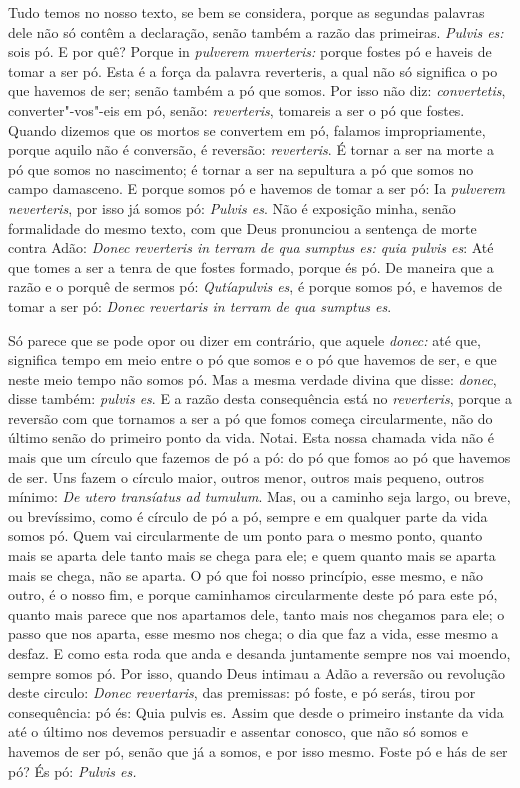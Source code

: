 Tudo temos no nosso texto, se bem se considera, porque as segundas
palavras dele não só contêm a declaração, senão também a razão das
primeiras. \emph{Pulvis es:} sois pó. E por quê? Porque in
\emph{pulverem mverteris:} porque fostes pó e haveis de tomar a ser pó.
Esta é a força da palavra reverteris, a qual não só significa o po que
havemos de ser; senão também a pó que somos. Por isso não diz:
\emph{convertetis}, converter"-vos"-eis em pó, senão: \emph{reverteris},
tomareis a ser o pó que fostes. Quando dizemos que os mortos se
convertem em pó, falamos impropriamente, porque aquilo não é conversão,
é reversão: \emph{reverteris}. É tornar a ser na morte a pó que somos no
nascimento; é tornar a ser na sepultura a pó que somos no campo
damasceno. E porque somos pó e havemos de tomar a ser pó: Ia
\emph{pulverem neverteris}, por isso já somos pó: \emph{Pulvis es}.
Não é exposição minha, senão formalidade do mesmo texto, com que Deus
pronunciou a sentença de morte contra Adão: \emph{Donec reverteris in
terram de qua sumptus es: quia pulvis es}: Até que tomes %
a ser a tenra de que fostes formado, porque és pó. De maneira que a
razão e o porquê de sermos pó: \emph{Qutíapulvis es}, é porque somos pó,
e havemos de tomar a ser pó: \emph{Donec revertaris in terram de qua
sumptus es}.

Só parece que se pode opor ou dizer em contrário, que aquele
\emph{donec:} até que, significa tempo em meio entre o pó que somos e o
pó que havemos de ser, e que neste meio tempo não somos pó. Mas a mesma
verdade divina que disse: \emph{donec}, disse também: \emph{pulvis es}.
E a razão desta consequência está no \emph{reverteris}, porque a
reversão com que tornamos a ser a pó que fomos começa circularmente, não
do último senão do primeiro ponto da vida. Notai. Esta nossa chamada
vida não é mais que um círculo que fazemos de pó a pó: do pó que fomos
ao pó que havemos de ser. Uns fazem o círculo maior, outros menor,
outros mais pequeno, outros mínimo: \emph{De utero transíatus ad
tumulum}. Mas, ou a caminho seja largo, ou breve, ou
brevíssimo, como é círculo de pó a pó, sempre e em qualquer parte da
vida somos pó. Quem vai circularmente de um ponto para o mesmo ponto,
quanto mais se aparta dele tanto mais se chega para ele; e quem quanto
mais se aparta mais se chega, não se aparta. O pó que foi nosso
princípio, esse mesmo, e não outro, é o nosso fim, e porque caminhamos
circularmente deste pó para este pó, quanto mais parece que nos
apartamos dele, tanto mais nos chegamos para ele; o passo que nos
aparta, esse mesmo nos chega; o dia que faz a vida, esse mesmo a desfaz.
E como esta roda que anda e desanda juntamente sempre nos vai moendo,
sempre somos pó. Por isso, quando Deus intimau a Adão a reversão ou
revolução deste circulo: \emph{Donec revertaris}, das premissas: pó
foste, e pó serás, tirou por consequência: pó és: Quia pulvis es. Assim
que desde o primeiro instante da vida até o último nos devemos persuadir
e assentar conosco, que não só somos e havemos de ser pó, senão que já a
somos, e por isso mesmo. Foste pó e hás de ser pó? És pó: \emph{Pulvis
es.}

